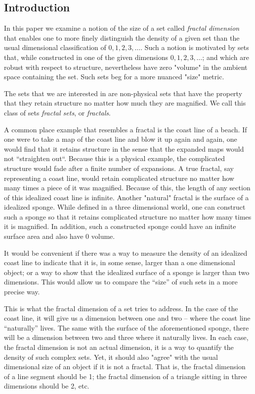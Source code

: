 \subsection{Introduction}
{\parindent=0pt
In this paper we examine a notion of the size of a set called 
{\it fractal dimension} that enables one to more
finely distinguish the density of a given set than the usual
dimensional classification of $0, 1, 2, 3, \ldots$.%
Such a notion is motivated by sets that, while constructed in one of the given
dimensions $0, 1, 2, 3, \dots$; and which are robust with respect to structure, 
nevertheless have zero "volume" in the ambient space containing the set.
Such sets beg for a more nuanced "size" metric.

The sets that we are interested in are non-physical sets that
have the property that they retain structure no matter how much 
they are magnified. We call this class of sets
{\it fractal sets}, or
{\it fractals}. 

A common place example that resembles a fractal is the coast line of
a beach. If one were to take a map of the coast line and blow it up
again and again, one would find that it retains structure in the
sense that the expanded maps would not ``straighten out``.
Because this is a physical example, the complicated structure would fade
after a finite number of expansions. A true fractal, say representing a 
coast line, would retain complicated
structure no matter how many times a piece of it was magnified.
Because of this, the length of any section of this idealized coast line is
infinite. Another "natural" fractal is the surface of a idealized sponge.
While defined in a three dimensional world, one can construct such a sponge so that
it retains complicated structure no matter how many times it is magnified.
In addition, such a constructed sponge could have an infinite surface area and 
also have 0 volume. 

It would be convenient if there was a way to
measure the density of an idealized coast line to
indicate that it is, in some sense, larger than a one dimensional
object; or a way to show that the idealized surface of a sponge is larger than
two dimensions. This would allow us to compare the ``size'' of such sets
in a more precise way.

This is what the fractal dimension of a set tries to address. 
In the case of the coast line, it will give us a dimension between one and two
-- where the coast line ``naturally'' lives. The same with the surface of
the aforementioned sponge,
there will be a dimension between two and three where it naturally lives. In
each case, the fractal dimension is not an actual dimension, 
it is a way to quantify the density of such complex sets.
Yet, it should also "agree" with the usual dimensional size of an object 
if it is not a fractal. That is, the fractal dimension of a line segment should 
be 1; the fractal dimension of a triangle sitting in three dimensions should 
be 2, etc.

}
